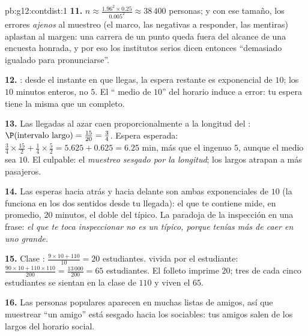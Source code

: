\begin{solution}{pb:g12:contdist:1}
\textbf{11.} $n \approx \frac{1.96^2 \times 0.25}{0.005^2} \approx
38\,400$ personas; y con ese tamaño, los errores \emph{ajenos} al muestreo
(el marco, las negativas a responder, las mentiras) aplastan al margen:
una carrera de un punto queda fuera del alcance de una encuesta honrada, y
por eso los institutos serios dicen entonces ``demasiado igualado para
pronunciarse''.

\textbf{12.} : desde el instante en que llegas, la espera
restante es exponencial de  $10$; los $10$ minutos enteros, no $5$. El
`` medio de $10$'' del horario induce a error: tu espera tiene la
misma  que un  completo.

\textbf{13.} Las llegadas al azar caen proporcionalmente a la longitud del
: $\P(\text{intervalo largo}) = \frac{15}{20} = \frac34$. Espera
esperada: $\frac34 \times \frac{15}{2} + \frac14 \times \frac52 =
5.625 + 0.625 = 6.25$ min, más que el ingenuo $5$, aunque el 
medio sea $10$. El culpable: el \emph{muestreo sesgado por la longitud};
los  largos atrapan a más pasajeros.

\textbf{14.} Las esperas hacia atrás y hacia delante son ambas
exponenciales de  $10$ (la  funciona en los dos
sentidos desde tu llegada): el  que te contiene mide, en promedio,
$20$ minutos, el doble del  típico. La paradoja de la inspección
en una frase: \emph{el  que te toca inspeccionar no es un
 típico, porque tenías más  de caer en uno grande.}

\textbf{15.} Clase : $\frac{9 \times 10 + 110}{10} = 20$ estudiantes.
 vivida por el estudiante:
$\frac{90 \times 10 + 110 \times 110}{200} = \frac{13\,000}{200} = 65$
estudiantes. El folleto imprime $20$; tres de cada cinco estudiantes se
sientan en la clase de $110$ y viven el $65$.

\textbf{16.} Las personas populares aparecen en muchas listas de amigos, así
que muestrear ``un amigo'' está sesgado hacia los sociables: tus amigos
salen de los  largos del horario social.


\end{solution}
